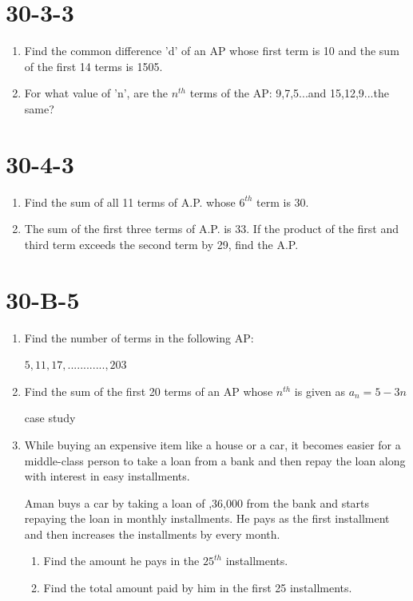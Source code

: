 \documentclass{article}
\begin{document}
\section{30-3-3}
\begin{enumerate}
    \item Find the common difference 'd' of an AP whose first term is 10 and the sum of the first 14 terms is 1505.
    \item For what value of 'n', are the $n^{th}$ terms of the AP: 9,7,5...and 15,12,9...the same?
\end{enumerate}

\section{30-4-3}
\begin{enumerate}
    \item Find the sum of all 11 terms of A.P. whose $6^{th}$ term is 30.
    \item The sum of the first three terms of A.P. is 33. If the product of the first and third term exceeds the second term by 29, find the A.P.
\end{enumerate}
\section{30-B-5}
\begin{enumerate}
    \item Find the number of terms in the following AP:
    
    $5,11,17,............,203$

    \item Find the sum of the first 20 terms of an AP whose $n^{th}$ is given as $a_n= 5 - 3n$
   \begin{center}

   case study
\end{center}
    \item While buying an expensive item like a house or a car, it becomes easier for a middle-class person to take a loan from a bank and then repay the loan along with interest in easy installments.\hfill \break
    
Aman buys a car by taking a loan of ,36,000 from the bank and starts repaying the loan in monthly installments. He pays  as the first installment and then increases the installments by  every month.     

 \begin{enumerate}
    
    \item Find the amount he pays in the $25^{th}$ installments.
    \item Find the total amount paid by him in the first 25 installments.



\end{enumerate}
\end{enumerate}
\end{document}

